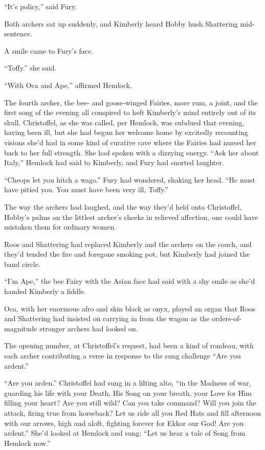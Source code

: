 \documentclass[11pt,a5paper]{article}
\begin{document}
``It's policy,'' said Fury.

Both archers sat up suddenly, and Kimberly heard Hobby hush Shattering mid-sentence.

A smile came to Fury's face.

``Toffy.'' she said.

``With Oca and Ape,'' affirmed Hemlock.



The fourth archer, the bee- and goose-winged Fairies, more rum, a joint, and the first song of the evening all conspired to heft Kimberly's mind entirely out of its skull. Christoffel, as she was called, per Hemlock, was subdued that evening, having been ill, but she had begun her welcome home by excitedly recounting visions she'd had in some kind of curative cave where the Fairies had nursed her back to her full strength. She had spoken with a dizzying energy. ``Ask her about Italy,'' Hemlock had said to Kimberly, and Fury had snorted laughter.

``Cheops let you hitch a wago.'' Fury had wondered, shaking her head. ``He must have pitied you. You must have been very ill, Toffy.''

The way the archers had laughed, and the way they'd held onto Christoffel, Hobby's palms on the littlest archer's cheeks in relieved affection, one could have mistaken them for ordinary women.

Roos and Shattering had replaced Kimberly and the archers on the couch, and they'd tended the fire and foregone smoking pot, but Kimberly had joined the band circle.

``I'm Ape,'' the bee Fairy with the Asian face had said with a shy smile as she'd handed Kimberly a fiddle.

Oca, with her enormous afro and skin black as onyx, played an organ that Roos and Shattering had insisted on carrying in from the wagon as the orders-of-magnitude stronger archers had looked on.

The opening number, at Christoffel's request, had been a kind of rondeau, with each archer contributing a verse in response to the sung challenge ``Are you ardent.''

``Are you arden.'' Christoffel had sung in a lilting alto, ``in the Madness of war, guarding his life with your Death, His Song on your breath, your Love for Him filling your heart? Are you still wild? Can you take command? Will you join the attack, firing true from horseback? Let us ride all you Red Hats and fill afternoon with our arrows, high and aloft, fighting forever for Ekkor our God! Are you ardent.'' She'd looked at Hemlock and sung: ``Let us hear a tale of Song from Hemlock now.''
\end{document}
